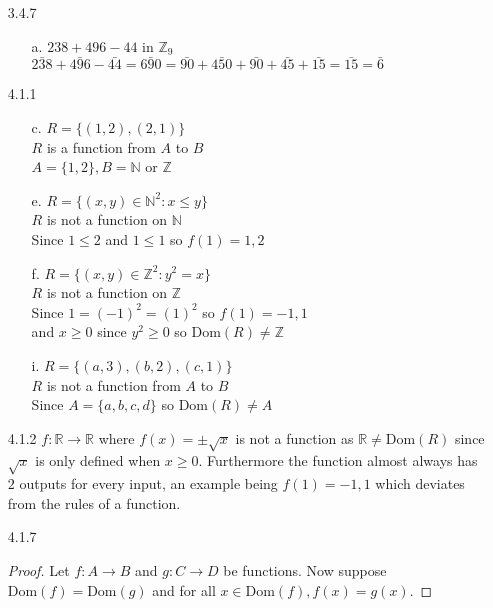 \documentclass[11pt]{amsart}
\theoremstyle{definition}
\begin{document}
\begin{itemize}
\begin{itemize}
\end{itemize}

\item[3.4.7]
\begin{itemize}
    \item[a.] $238+496-44$ in $\mathbb{Z}_9$ \\
              $\bar{238}+\bar{496}-\bar{44}=\bar{690}=\bar{90}+\bar{450}+\bar{90}+\bar{45}+\bar{15}=\bar{15}=\bar6$
    
\end{itemize}

\item[4.1.1]
\begin{itemize}
    \item[c.] $R=\{(1,2),(2,1)\}$ \\
              $R$ is a function from $A$ to $B$ \\
              $A=\{1,2\},B=\mathbb{N}$ or $\mathbb{Z}$

    \item[e.] $R=\{(x,y)\in\mathbb{N}^2:x\le y\}$ \\
              $R$ is not a function on $\mathbb{N}$ \\
              Since $1\le 2$ and $1\le 1$ so $f(1)=1,2$

    \item[f.] $R=\{(x,y)\in\mathbb{Z}^2:y^2=x\}$ \\
              $R$ is not a function on $\mathbb{Z}$ \\
              Since $1=(-1)^2=(1)^2$ so $f(1)=-1,1$ \\
              and $x\ge 0$ since $y^2\ge 0$ so $\text{Dom}(R)\ne\mathbb{Z}$

    \item[i.] $R=\{(a,3),(b,2),(c,1)\}$ \\
              $R$ is not a function from $A$ to $B$ \\
              Since $A=\{a,b,c,d\}$ so $\text{Dom}(R)\ne A$
    
\end{itemize}

\item[4.1.2] $f:\mathbb{R}\to\mathbb{R}$ where $f(x)=\pm\sqrt{x}$ is not a function as $\mathbb{R}\ne\text{Dom}(R)$ since $\sqrt{x}$ is only defined when $x\ge 0$. Furthermore the function almost always has $2$ outputs for every input, an example being $f(1)=-1,1$ which deviates from the rules of a function.

\item[4.1.7] \begin{proof}
    Let $f:A\to B$ and $g:C\to D$ be functions. Now suppose $\text{Dom}(f)=\text{Dom}(g)$ and for all $x\in\text{Dom}(f),f(x)=g(x)$.

\end{proof}
\end{itemize}
\end{document}
